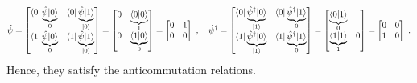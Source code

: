     \begin{equation*}
        \hat \psi = \begin{bmatrix}
            \langle0\vert \underbrace{\hat \psi \vert0\rangle}_0 & \langle0\vert \underbrace{\hat \psi \vert1\rangle}_{\vert0\rangle} \\ \langle1\vert \underbrace{\hat \psi \vert0\rangle}_0 & \langle1\vert \underbrace{\hat \psi \vert1\rangle}_{\vert0\rangle} \\
        \end{bmatrix} = \begin{bmatrix}
            0 & \underbrace{\langle0\vert0\rangle}_1 \\ 0 & \underbrace{\langle1\vert0\rangle}_0 \\
        \end{bmatrix} = \begin{bmatrix}
            0 & 1 \\ 0 & 0 \\
        \end{bmatrix} ~, \quad \hat \psi^\dagger = \begin{bmatrix}
            \langle0\vert \underbrace{\hat \psi^\dagger \vert0\rangle}_{\vert1\rangle} & \langle0\vert \underbrace{\hat \psi^\dagger \vert1\rangle}_0 \\ \langle1\vert \underbrace{\hat \psi^\dagger \vert0\rangle}_{\vert1\rangle} & \langle1\vert \underbrace{\hat \psi^\dagger \vert1\rangle}_0 \\
        \end{bmatrix} = \begin{bmatrix}
            \underbrace{\langle0\vert1\rangle}_0 & \\  \underbrace{\langle1\vert1\rangle}_1 &  0 \\
        \end{bmatrix} = \begin{bmatrix}
            0 & 0 \\ 1 & 0 \\
        \end{bmatrix} ~.
    \end{equation*}
    Hence, they satisfy the anticommutation relations.
